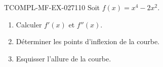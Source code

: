 \begin{exercice}{TCOMPL-MF-EX-027}{1}{10}
Soit $f(x) = x^4 - 2x^2$.
\begin{enumerate}
  \item Calculer $f'(x)$ et $f''(x)$.
  \item Déterminer les points d'inflexion de la courbe.
  \item Esquisser l'allure de la courbe.
\end{enumerate}

\end{exercice}
